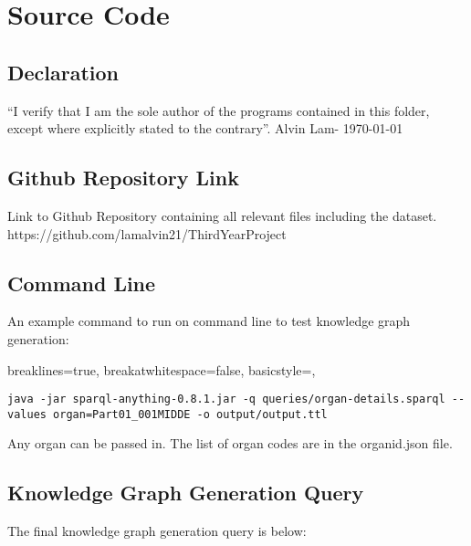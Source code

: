 \chapter{Source Code}
\section{Declaration}
``I verify that I am the sole author of the programs contained in this folder, except where explicitly stated to the contrary''. Alvin Lam- \today

\section{Github Repository Link}
Link to Github Repository containing all relevant files including the dataset. \\
https://github.com/lamalvin21/ThirdYearProject

\section{Command Line}
An example command to run on command line to test knowledge graph generation:

\lstset
{
    breaklines=true,
    breakatwhitespace=false,
    basicstyle=\linespread{1}\ttfamily,
}
\begin{lstlisting}
java -jar sparql-anything-0.8.1.jar -q queries/organ-details.sparql --values organ=Part01_001MIDDE -o output/output.ttl
\end{lstlisting}

Any organ can be passed in. The list of organ codes are in the organid.json file.

\section{Knowledge Graph Generation Query}
The final knowledge graph generation query is below:

